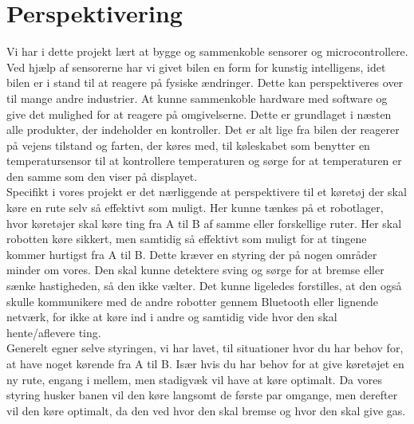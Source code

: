 \newpage
\section{Perspektivering}
\label{perspektivering}

Vi har i dette projekt lært at bygge og sammenkoble sensorer og microcontrollere. Ved hjælp af sensorerne har vi givet bilen en form for kunstig intelligens, idet bilen er i stand til at reagere på fysiske ændringer. Dette kan perspektiveres over til mange andre industrier. At kunne sammenkoble hardware med software og give det mulighed for at reagere på omgivelserne. Dette er grundlaget i næsten alle produkter, der indeholder en kontroller. Det er alt lige fra bilen der reagerer på vejens tilstand og farten, der køres med, til køleskabet som benytter en temperatursensor til at kontrollere temperaturen og sørge for at temperaturen er den samme som den viser på displayet. \\

Specifikt i vores projekt er det nærliggende at perspektivere til et køretøj der skal køre en rute selv så effektivt som muligt. Her kunne tænkes på et robotlager, hvor køretøjer skal køre ting fra A til B af samme eller forskellige ruter. Her skal robotten køre sikkert, men samtidig så effektivt som muligt for at tingene kommer hurtigst fra A til B. Dette kræver en styring der på nogen områder minder om vores. Den skal kunne detektere sving og sørge for at bremse eller sænke hastigheden, så den ikke vælter. Det kunne ligeledes forstilles, at den også skulle kommunikere med de andre robotter gennem Bluetooth eller lignende netværk, for ikke at køre ind i andre og samtidig vide hvor den skal hente/aflevere ting. \\

Generelt egner selve styringen, vi har lavet, til situationer hvor du har behov for, at have noget kørende fra A til B. Især hvis du har behov for at give køretøjet en ny rute, engang i mellem, men stadigvæk vil have at køre optimalt. Da vores styring husker banen vil den køre langsomt de første par omgange, men derefter vil den køre optimalt, da den ved hvor den skal bremse og hvor den skal give gas. 
















